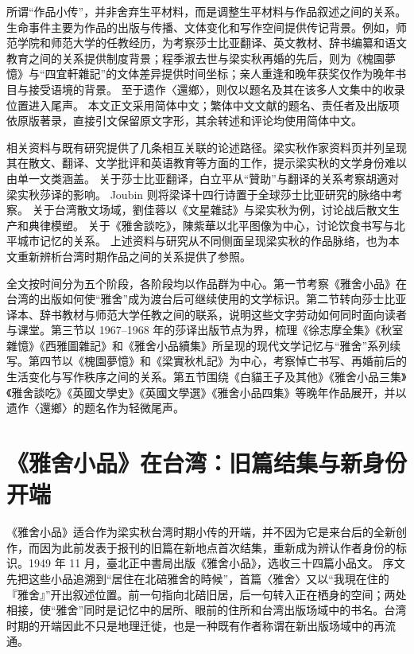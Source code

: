 \documentclass[UTF8,a4paper,zihao=-4,fontset=none]{ctexart}
\begin{document}
所谓“作品小传”，并非舍弃生平材料，而是调整生平材料与作品叙述之间的关系。生命事件主要为作品的出版与传播、文体变化和写作空间提供传记背景。例如，师范学院和师范大学的任教经历，为考察莎士比亚翻译、英文教材、辞书编纂和语文教育之间的关系提供制度背景；程季淑去世与梁实秋再婚的先后，则为《槐園夢憶》与“四宜軒雜記”的文体差异提供时间坐标；亲人重逢和晚年获奖仅作为晚年书目与接受语境的背景。\autocite{nmtl_liang_chronology,ntnu_liang_house_chronology} 至于遗作〈還鄉〉，则仅以题名及其在该多人文集中的收录位置进入尾声。\cite{1987還鄉} 本文正文采用简体中文；繁体中文文献的题名、责任者及出版项依原版著录，直接引文保留原文字形，其余转述和评论均使用简体中文。

相关资料与既有研究提供了几条相互关联的论述路径。梁实秋作家资料页并列呈现其在散文、翻译、文学批评和英语教育等方面的工作，提示梁实秋的文学身份难以由单一文类涵盖。\autocite{wenhsun_liang_author} 关于莎士比亚翻译，白立平从“贊助”与翻译的关系考察胡適对梁实秋莎译的影响。\autocite{bai2001_patronage_translation} Joubin 则将梁译十四行诗置于全球莎士比亚研究的脉络中考察。\autocite{joubin2023_liang_sonnets} 关于台湾散文场域，劉佳蓉以《文星雜誌》与梁实秋为例，讨论战后散文生产和典律模塑。\autocite{liujiarong2017_wenxing_liang} 关于《雅舍談吃》，陳紫華以北平图像为中心，讨论饮食书写与北平城市记忆的关系。\autocite{chenzihua2012_yashe_tanchi} 上述资料与研究从不同侧面呈现梁实秋的作品脉络，也为本文重新辨析台湾时期作品之间的关系提供了参照。

全文按时间分为五个阶段，各阶段均以作品群为中心。第一节考察《雅舍小品》在台湾的出版如何使“雅舍”成为渡台后可继续使用的文学标识。第二节转向莎士比亚译本、辞书教材与师范大学任教之间的联系，说明这些文字劳动如何同时面向读者与课堂。第三节以 1967--1968 年的莎译出版节点为界，梳理《徐志摩全集》《秋室雜憶》《西雅圖雜記》和《雅舍小品續集》所呈现的现代文学记忆与“雅舍”系列续写。第四节以《槐園夢憶》和《梁實秋札記》为中心，考察悼亡书写、再婚前后的生活变化与写作秩序之间的关系。第五节围绕《白貓王子及其他》《雅舍小品三集》《雅舍談吃》《英國文學史》《英國文學選》《雅舍小品四集》等晚年作品展开，并以遗作〈還鄉〉的题名作为轻微尾声。

\section{《雅舍小品》在台湾：旧篇结集与新身份开端}

《雅舍小品》适合作为梁实秋台湾时期小传的开端，并不因为它是来台后的全新创作，而因为此前发表于报刊的旧篇在新地点首次结集，重新成为辨认作者身份的标识。1949 年 11 月，臺北正中書局出版《雅舍小品》，选收三十四篇小品文。\autocite{nmtl_liang_chronology,liang_yashe_xiaopin_ncl_scan} 序文先把这些小品追溯到“居住在北碚雅舍的時候”\autocite{liang_yashe_xiaopin_ncl_scan}，首篇〈雅舍〉又以“我現在住的『雅舍』”\autocite{liang_yashe_xiaopin_ncl_scan}开出叙述位置。前一句指向北碚旧居，后一句转入正在栖身的空间；两处相接，使“雅舍”同时是记忆中的居所、眼前的住所和台湾出版场域中的书名。台湾时期的开端因此不只是地理迁徙，也是一种既有作者称谓在新出版场域中的再流通。
\end{document}
